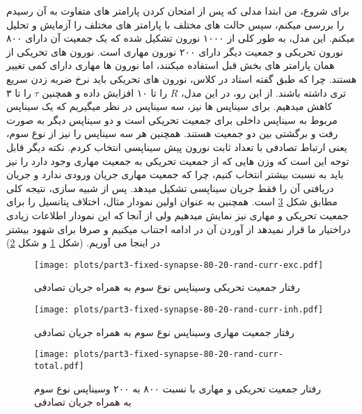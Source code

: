     برای شروع، من ابتدا مدلی که پس از امتحان کردن پارامتر های متفاوت به آن رسیدم را بررسی میکنم، سپس حالت های مختلف با پارامتر های مختلف را آزمایش و تحلیل میکنم.
    این مدل، به طور کلی از ۱۰۰۰ نورون تشکیل شده که یک جمعیت آن دارای ۸۰۰ نورون تحریکی و جمعیت دیگر دارای ۲۰۰ نورون مهاری است. نورون های تحریکی از همان پارامتر های بخش قبل استفاده میکنند، اما نورون ها مهاری دارای کمی تغییر هستند. چرا که طبق گفته استاد در کلاس، نورون های تحریکی باید نرخ ضربه زدن سریع تری داشته باشند. از این رو، در این مدل، 
    $R$ 
    را تا ۱۰ افزایش داده و همچنین 
    $\tau$ 
    را تا ۳ کاهش میدهیم. برای سیناپس ها نیز، سه سیناپس در نظر میگیریم که یک سیناپس مربوط به سیناپس داخلی برای جمعیت تحریکی است و دو سیناپس دیگر به صورت رفت و برگشتی بین دو جمعیت هستند. همچنین هر سه سیناپس را نیز از نوع سوم، یعنی ارتباط تصادفی با تعداد ثابت نورون پیش سیناپسی انتخاب کردم. نکته دیگر قابل توجه این است که وزن هایی که از جمعیت تحریکی به جمعیت مهاری وجود دارد را نیز باید به نسبت بیشتر انتخاب کنیم، چرا که جمعیت مهاری جریان ورودی ندارد و جریان دریافتی آن را فقط جریان سیناپسی تشکیل میدهد. پس از شبیه سازی، نتیجه کلی مطابق شکل
    \ref{fig:part3-fixed-synapse-80-20-rand-curr-total}
    است. همچنین به عنوان اولین نمودار مثال، اختلاف پتانسیل را برای جمعیت تحریکی و مهاری نیز نمایش میدهیم ولی از آنجا که این نمودار اطلاعات زیادی دراختیار ما قرار نمیدهد از آوردن آن در ادامه اجتناب میکنیم و صرفا برای شهود بیشتر در اینجا می آوریم.
    (شکل \ref{fig:part3-fixed-synapse-80-20-rand-curr-exc}
    و شکل \ref{fig:part3-fixed-synapse-80-20-rand-curr-inh})
    \begin{figure}[!ht]
        \centering
        \texttt{[image: plots/part3-fixed-synapse-80-20-rand-curr-exc.pdf]} 
        \caption{رفتار جمعیت تحریکی وسیناپس نوع سوم به همراه جریان تصادفی}
        \label{fig:part3-fixed-synapse-80-20-rand-curr-exc}
    \end{figure}
    \begin{figure}[!ht]
        \centering
        \texttt{[image: plots/part3-fixed-synapse-80-20-rand-curr-inh.pdf]} 
        \caption{رفتار جمعیت مهاری وسیناپس نوع سوم به همراه جریان تصادفی}
        \label{fig:part3-fixed-synapse-80-20-rand-curr-inh}
    \end{figure}
    \begin{figure}[!ht]
        \centering
        \texttt{[image: plots/part3-fixed-synapse-80-20-rand-curr-total.pdf]} 
        \caption{رفتار جمعیت تحریکی و مهاری با نسبت ۸۰۰ به ۲۰۰ وسیناپس نوع سوم به همراه جریان تصادفی}
        \label{fig:part3-fixed-synapse-80-20-rand-curr-total}
    \end{figure}

